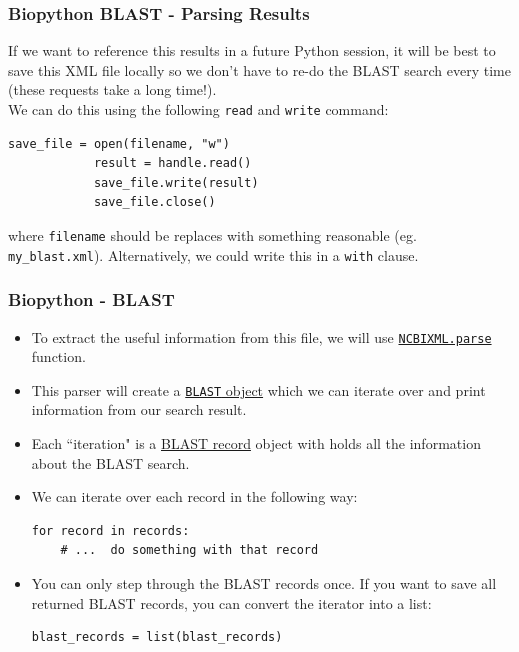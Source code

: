 \documentclass[xcolor=svgnames, handout]{beamer}
\newcommand{\nl}{\\[1em]}
\newcommand{\ft}[1]{\frametitle{#1}}
\begin{document}
\begin{frame}[fragile]\ft{Biopython BLAST - Parsing Results}
If we want to reference this results in a future Python session, it will be best to save this XML file locally so we don't have to re-do the BLAST search every time (these requests take a long time!).\nl
  We can do this using the following {\tt read} and {\tt write} command:
\begin{Verbatim}[frame=single]
            save_file = open(filename, "w")
            result = handle.read()
            save_file.write(result)
            save_file.close()
\end{Verbatim}
where {\tt filename} should be replaces with something reasonable (eg. {\tt my\_blast.xml}).  Alternatively, we could write this in a {\tt with} clause.\nl


\end{frame}


\begin{frame}[fragile]\ft{Biopython - BLAST}
\begin{itemize}
\item To extract the useful information from this file, we will use \href{https://biopython.org/DIST/docs/api/Bio.Blast.NCBIXML-module.html}{\tt NCBIXML.parse} function.  
\item This parser will create a \href{https://biopython.org/DIST/docs/api/Bio.Blast.Record.Blast-class.html}{\texttt{BLAST} object} which we can iterate over and print information from our search result. %
\item Each ``iteration" is a \href{http://biopython.org/DIST/docs/api/Bio.Blast.Record-module.html}{BLAST record} object with holds all the information about the BLAST search.
\item We can iterate over each record in the following way:
\begin{Verbatim}[frame=single]
for record in records:     
	# ...  do something with that record
\end{Verbatim}
\item You can only step through the BLAST records  once. %
If you want to save all returned BLAST records, you can convert the iterator into a list:
\begin{Verbatim}[frame=single]
blast_records = list(blast_records)
\end{Verbatim}
\end{itemize}
\end{frame}
\end{document}
